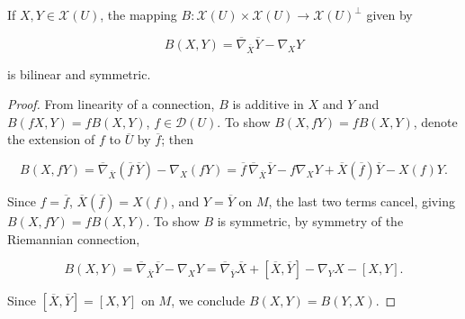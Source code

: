 \begin{proposition}
  \label{prop:dc-ch6-2-1}
  \leanok
  If $X,Y\in\mathcal{X}(U)$, the mapping
  $B:\mathcal{X}(U)\times\mathcal{X}(U)\to\mathcal{X}(U)^\perp$ given by

  $$
  B(X,Y)=\overline{\nabla}_{\overline{X}}\overline{Y}-\nabla_X Y
  $$

  is bilinear and symmetric.
\end{proposition}
\begin{proof}
  \leanok
  \sketch
  From linearity of a connection, $B$ is additive in $X$ and $Y$ and
  $B(fX,Y)=fB(X,Y)$, $f\in\mathcal{D}(U)$. To show $B(X,fY)=fB(X,Y)$, denote the
  extension of $f$ to $\overline{U}$ by $\overline{f}$; then

  $$
  B(X,fY)=\overline{\nabla}_{\overline{X}}(\overline{f}\,\overline{Y})-\nabla_X(fY)=\overline{f}\,\overline{\nabla}_{\overline{X}}\overline{Y}-f\nabla_X Y+\overline{X}(\overline{f})\overline{Y}-X(f)Y.
  $$

  Since $f=\overline{f}$, $\overline{X}(\overline{f})=X(f)$, and $Y=\overline{Y}$ on
  $M$, the last two terms cancel, giving $B(X,fY)=fB(X,Y)$. To show $B$ is
  symmetric, by symmetry of the Riemannian connection,

  $$
  B(X,Y)=\overline{\nabla}_{\overline{X}}\overline{Y}-\nabla_X Y=\overline{\nabla}_{\overline{Y}}\overline{X}+[\overline{X},\overline{Y}]-\nabla_Y X-[X,Y].
  $$

  Since $[\overline{X},\overline{Y}]=[X,Y]$ on $M$, we conclude $B(X,Y)=B(Y,X)$.
\end{proof}

